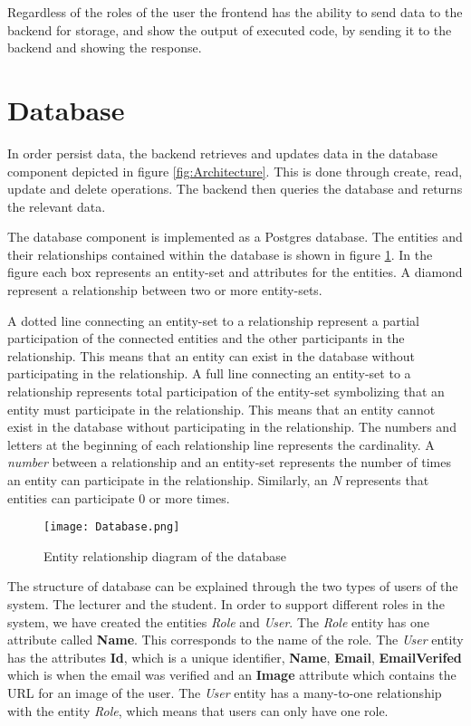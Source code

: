 Regardless of the roles of the user the frontend has the ability to send data to the backend for storage, and show the output of executed code, by sending it to the backend and showing the response.

\section{Database}
In order persist data, the backend retrieves and updates data in the database component depicted in figure \ref{fig:Architecture}. This is done through create, read, update and delete operations.
The backend then queries the database and returns the relevant data.

The database component is implemented as a Postgres database. The entities and their relationships contained within the database is shown in figure \ref{fig:Database}. In the figure each box represents an entity-set and attributes for the entities. A diamond represent a relationship between two or more entity-sets.

A dotted line connecting an entity-set to a relationship represent a partial participation of the connected entities and the other participants in the relationship. This means that an entity can exist in the database without participating in the relationship.
A full line connecting an entity-set to a relationship represents total participation of the entity-set symbolizing that an entity must participate in the relationship.
This means that an entity cannot exist in the database without participating in the relationship.
The numbers and letters at the beginning of each relationship line represents the cardinality. A \textit{number} between a relationship and an entity-set represents the number of times an entity can participate in the relationship. Similarly, an \textit{N} represents that entities can participate $0$ or more times.

\begin{figure}[H]
	\texttt{[image: Database.png]}
	\centering
	\caption{Entity relationship diagram of the database}
	\label{fig:Database}
\end{figure}

The structure of database can be explained through the two types of users of the system. The lecturer and the student.
In order to support different roles in the system, we have created the entities \textit{Role} and \textit{User}. The \textit{Role} entity has one attribute called \textbf{Name}. This corresponds to the name of the role. The \textit{User} entity has the attributes \textbf{Id}, which is a unique identifier, \textbf{Name}, \textbf{Email}, \textbf{EmailVerifed} which is when the email was verified and an \textbf{Image} attribute which contains the URL for an image of the user. The \textit{User} entity has a many-to-one relationship with the entity \textit{Role}, which means that users can only have one role.

